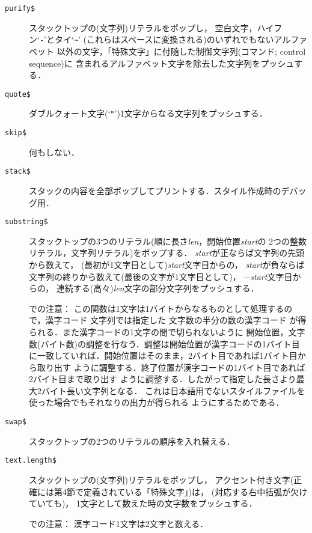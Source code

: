 \begin{description}
\item[\hbox{\tt purify\$}\hfill]
スタックトップの(文字列)リテラルをポップし，
空白文字，ハイフン`\verb|-|'とタイ`\verb|~|'
(これらはスペースに変換される)のいずれでもないアルファベット
以外の文字，「特殊文字」に付随した制御文字列(コマンド; control sequence)に
含まれるアルファベット文字を除去した文字列をプッシュする．

\item[\hbox{\tt quote\$}\hfill]
ダブルクォート文字(`\verb|"|')1文字からなる文字列をプッシュする．

\item[\hbox{\tt skip\$}\hfill]
何もしない．

\item[\hbox{\tt stack\$}\hfill]
スタックの内容を全部ポップしてプリントする．スタイル作成時のデバッグ用．

\item[\hbox{\tt substring\$}\hfill]
スタックトップの3つのリテラル(順に長さ{\it len}，開始位置{\it start}の
2つの整数リテラル，文字列リテラル)をポップする．
{\it start}が正ならば文字列の先頭から数えて，
(最初が1文字目として){\it start}文字目からの，
{\it start}が負ならば文字列の終りから数えて(最後の文字が1文字目として)，
$-${\it start}文字目からの，
連続する(高々){\it len}文字の部分文字列をプッシュする．

{\dg \JBibTeX での注意}：
この関数は1文字は1バイトからなるものとして処理するので，漢字コード
文字列では指定した
文字数の半分の数の漢字コード
が得られる．また漢字コードの1文字の間で切られないように
開始位置，文字数(バイト数)の調整を行なう．調整は開始位置が漢字コードの1バイト目
に一致していれば．開始位置はそのまま，2バイト目であれば1バイト目から取り出す
ように調整する．終了位置が漢字コードの1バイト目であれば2バイト目まで取り出す
ように調整する．したがって指定した長さより最大2バイト長い文字列となる．
これは日本語用でないスタイルファイルを使った場合でもそれなりの出力が得られる
ようにするためである．

\item[\hbox{\tt swap\$}\hfill]
スタックトップの2つのリテラルの順序を入れ替える．

\item[\hbox{\tt text.length\$}\hfill]
スタックトップの(文字列)リテラルをポップし，
アクセント付き文字(正確には第4節で定義されている「特殊文字」)は，
(対応する右中括弧が欠けていても)，
1文字として数えた時の文字数をプッシュする．

{\dg \JBibTeX での注意}：
漢字コード1文字は2文字と数える．


\end{description}

